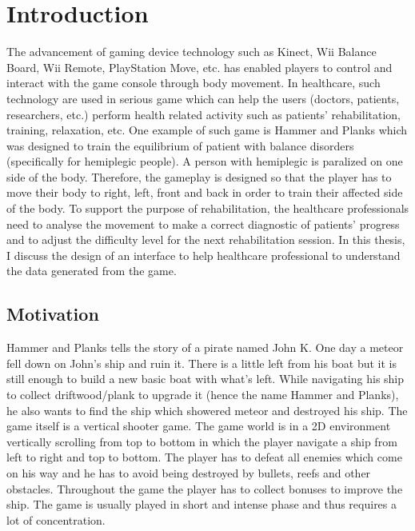 \chapter{Introduction}
\label{chap:intro}

The advancement of gaming device technology such as Kinect, Wii Balance Board, Wii Remote, PlayStation Move, etc. has enabled players to control and interact with the game console through body movement. In healthcare, such technology are used in serious game which can help the users (doctors, patients, researchers, etc.)  perform health related activity such as patients' rehabilitation, training, relaxation, etc. One example of such game is Hammer and Planks which was designed to train the equilibrium of patient with balance disorders (specifically for hemiplegic people)\cite{diloreto}. A person with hemiplegic is paralized on one side of the body. Therefore, the gameplay is designed so that the player has to move their body to right, left, front and back in order to train their affected side of the body. To support the purpose of rehabilitation, the healthcare professionals need to analyse the movement to  make a correct diagnostic of patients' progress and to adjust the difficulty level for the next rehabilitation session. In this thesis, I discuss the design of an interface to help healthcare professional to understand the data generated from the game.

\section{Motivation}

Hammer and Planks tells the story of a pirate named John K. One day a meteor fell down on John's ship and ruin it. There is a little left from his boat but it is still enough to build a new basic boat with what's left. While navigating his ship to collect driftwood/plank to upgrade it (hence the name Hammer and Planks), he also wants to find the ship which showered meteor and destroyed his ship. The game itself is a vertical shooter game. The game world is in a 2D environment vertically scrolling from top to bottom in which the player navigate a ship from left to right and top to bottom. The player has to defeat all enemies which come on his way and he has to avoid being destroyed by bullets, reefs and other obstacles. Throughout the game the player has to collect bonuses to improve the ship. The game is usually played in short and intense phase and thus requires a lot of concentration\cite{diloreto}.

